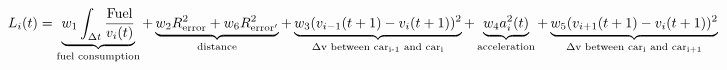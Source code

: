 \documentclass[12pt]{standalone}
\begin{document}
   \begin{varwidth}{50in}
        \begin{equation*}
			L_i(t) = \underbrace{w_1 \int_{\Delta t} \frac{\textrm{Fuel}}{v_i(t)}}_\textrm{fuel consumption} + \underbrace{w_2 R_{\textrm{error}}^2 + w_6 R_{\textrm{error}'}^2}_\textrm{distance} + \underbrace{w_3(v_{i-1}(t+1) - v_{i}(t+1))^2}_\textrm{$\Delta$v between car\textsubscript{i-1} and car\textsubscript{i}} + \underbrace{w_4a_i^2(t)}_\textrm{acceleration} +\underbrace{ w_5(v_{i+1}(t+1) - v_{i}(t+1))^2}_\textrm{$\Delta$v between car\textsubscript{i} and car\textsubscript{i+1}}
        \end{equation*}
    \end{varwidth}
\end{document}
